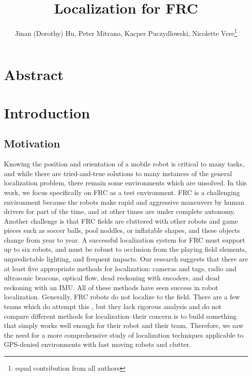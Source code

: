 \documentclass{article}
\begin{document}
\title{Localization for FRC}
\author{Jinan (Dorothy) Hu, Peter Mitrano, Kacper Puczydlowski, Nicolette Vere\thanks{equal contribution from all authors}}

\maketitle{}




\section*{Abstract}





\section{Introduction}




\subsection{Motivation}

  Knowing the position and orientation of a mobile robot is critical to many tasks, and while there are tried-and-true solutions to many instances of the general localization problem, there remain some environments which are unsolved. In this work, we focus specifically on FRC as a test environment. FRC is a challenging environment because the robots make rapid and aggressive maneuvers by human drivers for part of the time, and at other times are under complete autonomy. Another challenge is that FRC fields are cluttered with other robots and game pieces such as soccer balls, pool noddles, or inflatable shapes, and these objects change from year to year. A successful localization system for FRC must support up to six robots, and must be robust to occlusion from the playing field elements, unpredictable lighting, and frequent impacts. Our research suggests that there are at least five appropriate methods for localization: cameras and tags, radio and ultrasonic beacons, optical flow, dead reckoning with encoders, and dead reckoning with an IMU. All of these methods have seen success in robot localization. Generally, FRC robots do not localize to the field. There are a few teams which do attempt this \cite{balaji_zebravision_2017}, but they lack rigorous analysis and do not compare different methods for localization--their concern is to build something that simply works well enough for their robot and their team. Therefore, we saw the need for a more comprehensive study of localization techniques applicable to GPS-denied environments with fast moving robots and clutter.
\end{document}

